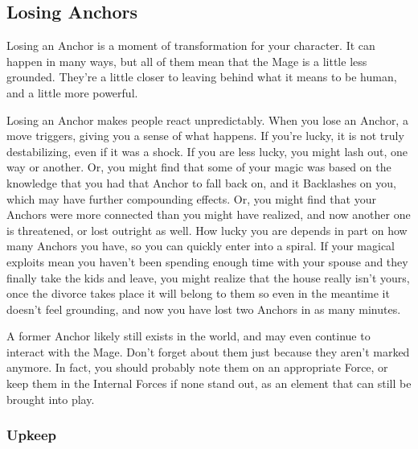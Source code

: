 \documentclass[
  oneside,
  statementpaper,
  9pt]{memoir}
\begin{document}
\hypertarget{losing-anchors}{%
\subsection{Losing Anchors}\label{losing-anchors}}

\begin{Player}

Losing an Anchor is a moment of transformation for your character. It can happen in many ways, but all of them mean that the Mage is a little less grounded. They’re a little closer to leaving behind what it means to be human, and a little more powerful.

Losing an Anchor makes people react unpredictably. When you lose an Anchor, a move triggers, giving you a sense of what happens. If you’re lucky, it is not truly destabilizing, even if it was a shock. If you are less lucky, you might lash out, one way or another. Or, you might find that some of your magic was based on the knowledge that you had that Anchor to fall back on, and it Backlashes on you, which may have further compounding effects. Or, you might find that your Anchors were more connected than you might have realized, and now another one is threatened, or lost outright as well. How lucky you are depends in part on how many Anchors you have, so you can quickly enter into a spiral. If your magical exploits mean you haven’t been spending enough time with your spouse and they finally take the kids and leave, you might realize that the house really isn’t yours, once the divorce takes place it will belong to them so even in the meantime it doesn’t feel grounding, and now you have lost two Anchors in as many minutes.

\end{Player}

\begin{MC}

A former Anchor likely still exists in the world, and may even continue to interact with the Mage. Don’t forget about them just because they aren’t marked anymore. In fact, you should probably note them on an appropriate Force, or keep them in the Internal Forces if none stand out, as an element that can still be brought into play.

\end{MC}

\hypertarget{upkeep}{%
\subsubsection{Upkeep}\label{upkeep}}
\end{document}
